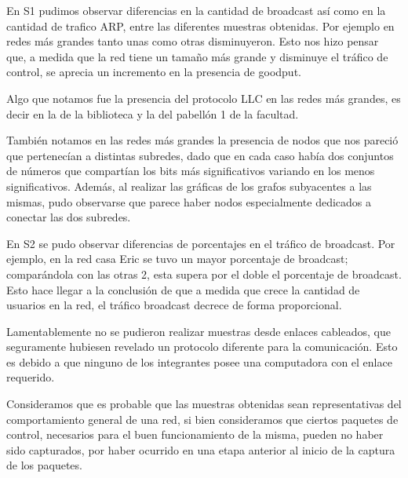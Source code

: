 	En S1 pudimos observar diferencias en la cantidad de broadcast así
    como en la cantidad de trafico ARP, entre las diferentes muestras
    obtenidas. Por ejemplo en redes más grandes tanto unas como otras
    disminuyeron. Esto nos hizo pensar que, a medida que la red tiene
    un tamaño más grande y disminuye el tráfico de control, se aprecia
    un incremento en la presencia de goodput.

    
    Algo que notamos fue la presencia del protocolo LLC en las redes
    más grandes, es decir en la de la biblioteca y la del pabellón 1
    de la facultad.

    También notamos en las redes más grandes la presencia de nodos que
    nos pareció que pertenecían a distintas subredes, dado que en cada
    caso había dos conjuntos de números que compartían los bits más
    significativos variando en los menos significativos. Además, al
    realizar las gráficas de los grafos subyacentes a las mismas,
    pudo observarse que parece haber nodos especialmente dedicados a
    conectar las dos subredes.

    En S2 se pudo observar diferencias de porcentajes en el tráfico de
    broadcast. Por ejemplo, en la red casa Eric se tuvo un mayor
    porcentaje de broadcast; comparándola con las otras 2, esta supera
    por el doble el porcentaje de broadcast. Esto hace llegar a la
    conclusión de que a medida que crece la cantidad de usuarios en la
    red, el tráfico broadcast decrece de forma proporcional.


Lamentablemente no se pudieron realizar muestras desde enlaces cableados, que seguramente
hubiesen revelado un protocolo diferente para la comunicación. Esto es debido a que
ninguno de los integrantes posee una computadora con el enlace requerido.

Consideramos que es probable que las muestras obtenidas sean
representativas del comportamiento general de una red, si bien
consideramos que ciertos paquetes de control, necesarios para el buen
funcionamiento de la misma, pueden no haber sido capturados, por haber ocurrido en
una etapa anterior al inicio de la captura de los paquetes.


